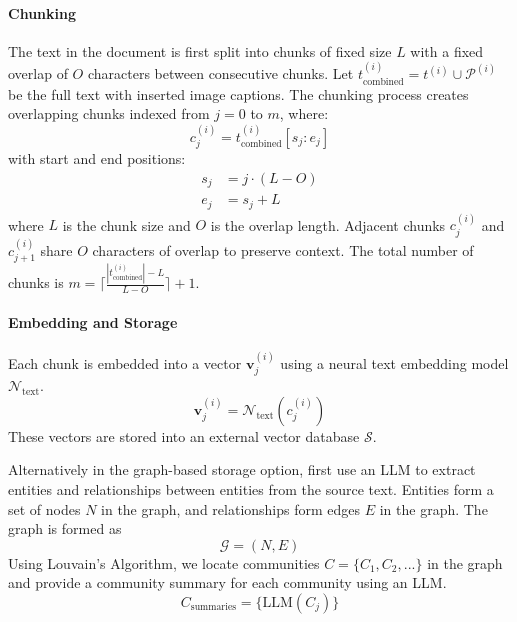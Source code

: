 \paragraph{Chunking}
The text in the document is first split into chunks of fixed size $L$ with a fixed overlap of $O$ characters between consecutive chunks.
Let $t_\text{combined}^{(i)} = t^{(i)} \cup \mathcal{P}^{(i)}$ be the full text with inserted image captions.
The chunking process creates overlapping chunks indexed from $j = 0$ to $m$, where:
\begin{equation}
    c_j^{(i)} = t_\text{combined}^{(i)}[s_j : e_j]
\end{equation}
with start and end positions:
\begin{equation}
    \begin{split}
        s_j &= j \cdot (L - O) \\
        e_j &= s_j + L
    \end{split}
\end{equation}
where $L$ is the chunk size and $O$ is the overlap length.
Adjacent chunks $c_j^{(i)}$ and $c_{j+1}^{(i)}$ share $O$ characters of overlap to preserve context.
The total number of chunks is $m = \lceil \frac{|t_\text{combined}^{(i)}| - L}{L - O} \rceil + 1$.

\paragraph{Embedding and Storage}
Each chunk is embedded into a vector $\mathbf{v}_j^{(i)}$ using a neural text embedding model $\mathcal{N}_{\text{text}}$.
\begin{equation}
    \mathbf{v}_j^{(i)} = \mathcal{N}_{\text{text}}(c_j^{(i)})
\end{equation}
These vectors are stored into an external vector database $\mathcal{S}$.

Alternatively in the graph-based storage option, first use an LLM to extract entities and relationships between entities from the source text.
Entities form a set of nodes $N$ in the graph, and relationships form edges $E$ in the graph.
The graph is formed as
\begin{equation}
    \mathcal{G} = (N, E)
\end{equation}
Using Louvain's Algorithm, we locate communities $C = \{C_1, C_2, ...\}$ in the graph and provide a community summary for each community using an LLM.
\begin{equation}
    C_{\text{summaries}} = \{\mathrm{LLM}(C_j)\}
\end{equation}

